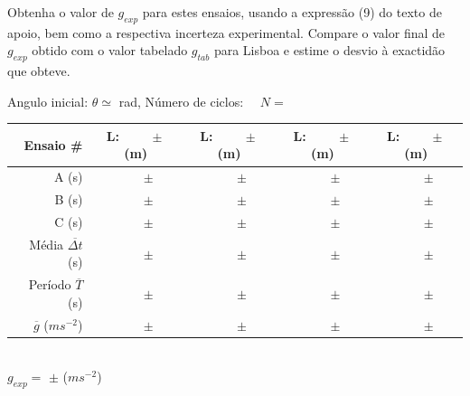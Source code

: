 \documentclass[a4paper,12pt]{article}      %
\begin{document}
Obtenha o valor de $g_{exp}$ para estes ensaios, usando a expressão (9) do texto de apoio, bem como a respectiva incerteza experimental. 
Compare o valor final de $g_{exp}$ obtido com o valor tabelado $g_{tab}$ para Lisboa e estime o desvio à exactidão que obteve. 

\begin{center}
\begin{small}
	\noindent Angulo inicial:	$\theta \simeq$ \underline{\makebox[1.5cm][r]{~}} rad,  Número de ciclos: $\quad N=$\underline{\makebox[1cm][r]{~}} \\
\bigskip
\begin{tabular}{|r|c|c|c|c|}
\hline
Ensaio  \# & L: $\qquad \pm$ \qquad (m) & L: $\qquad \pm$ \qquad(m) & L: $\qquad \pm$ \qquad(m) & L: $\qquad \pm$ \qquad(m)\\
\hline \hline
A  (s)&  $\qquad \pm$ \quad &  $\qquad \pm$ \quad&  $\qquad \pm$ \quad&  $\qquad \pm$ \quad\\ \hline
B  (s)&  $\qquad \pm$ \quad &  $\qquad \pm$ \quad&  $\qquad \pm$ \quad&  $\qquad \pm$ \quad\\ \hline
C  (s)&  $\qquad \pm$ \quad &  $\qquad \pm$ \quad&  $\qquad \pm$ \quad&  $\qquad \pm$ \quad\\ \hline
\hline 
Média $\overline{\Delta t}$ (s) & $\qquad \pm$ \quad  & $\qquad \pm$ \quad  &  $\qquad \pm$ \quad  & $\qquad \pm$ \quad \\
Período $\overline{T}$ (s) & $\qquad \pm$ \quad  & $\qquad \pm$ \quad  &  $\qquad \pm$ \quad  &  $\qquad \pm$ \quad  \\
 $\overline{g}$ ($m s^{-2}$) & $\qquad \pm$ \quad  & $\qquad \pm$ \quad  & $\qquad \pm$ \quad & $\qquad \pm$ \quad \\
\hline

\end{tabular}
\end{small}
~\\
\bigskip
	$g_{exp}=$ \underline{\makebox[1.5cm][r]{~}}  $\pm$  	\underline{\makebox[1cm][r]{~}} ($m s^{-2}$)
\end{center}

\end{document}

